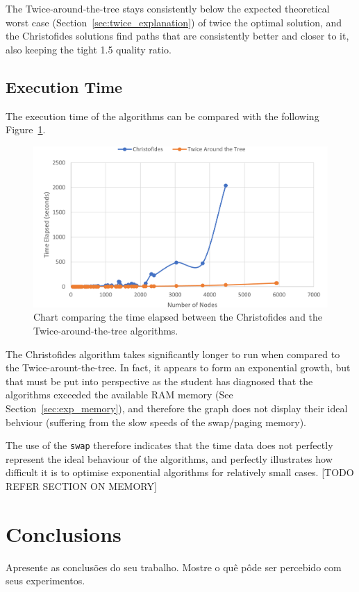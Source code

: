 \documentclass[12pt]{article}
\begin{document}
The Twice-around-the-tree stays consistently below the expected theoretical worst case (Section~\ref{sec:twice_explanation}) of 
twice the optimal solution, and the Christofides solutions find paths that are consistently better and closer to it, 
also keeping the tight 1.5 quality ratio.

\subsection{Execution Time} \label{sec:exp_time}

The execution time of the algorithms can be compared with the following Figure~\ref{fig:exec_time}.

\begin{figure}[ht]
\centering
\includegraphics[height=.325\textheight]{execution_time_comparison.png}
\caption{Chart comparing the time elapsed between the Christofides and the Twice-around-the-tree algorithms.}
\label{fig:exec_time}
\end{figure}

The Christofides algorithm takes significantly longer to run when compared to the Twice-arount-the-tree. 
In fact, it appears to form an exponential growth, but that must be put into perspective as the student 
has diagnosed that the algorithms exceeded the available RAM memory (See Section~\ref{sec:exp_memory}), and therefore 
the graph does not display their ideal behviour (suffering from the slow speeds of the swap/paging memory).

The use of the \texttt{swap} therefore indicates that the time data does not perfectly represent the ideal behaviour 
of the algorithms, and perfectly illustrates how difficult it is to optimise exponential algorithms for relatively 
small cases. [TODO REFER SECTION ON MEMORY]

\section{Conclusions} \label{sec:conclusions}
    Apresente as conclusões do seu trabalho. Mostre o quê pôde ser percebido
    com seus experimentos.



\end{document}
